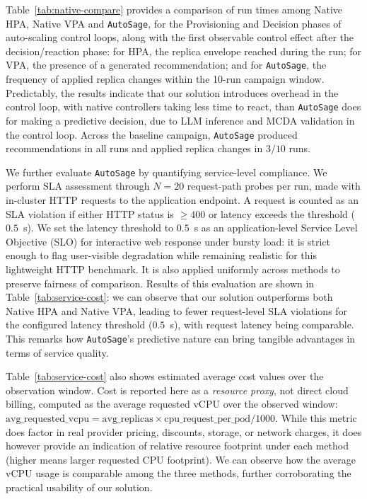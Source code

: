 \documentclass[sigconf]{acmart}
\newcommand{\Solution}{\texttt{AutoSage}}
\begin{document}
Table~\ref{tab:native-compare} provides a comparison of run times among Native HPA, Native VPA and \Solution{}, for the Provisioning and Decision phases of auto-scaling control loops, along with the first observable control effect after the decision/reaction phase: for HPA, the replica envelope reached during the run; for VPA, the presence of a generated recommendation; and for \Solution{}, the frequency of applied replica changes within the 10-run campaign window.
Predictably, the results indicate that our solution introduces overhead in the control loop, with native controllers taking less time to react,
than \Solution{} does for making a predictive decision, due to LLM inference and MCDA
validation in the control loop. Across the baseline
campaign, \Solution{} produced recommendations in all runs and applied
replica changes in \(3/10\) runs.

We further evaluate \Solution{} by quantifying service-level compliance. We perform SLA assessment through $N=20$ request-path probes per run, made with in-cluster HTTP
requests to the application endpoint. A request is counted as an SLA violation if either HTTP
status is \(\ge 400\) or latency exceeds the threshold (\(0.5\)~s). 
We set the latency threshold to \(0.5\)~s as an application-level Service Level Objective (SLO) for interactive web response under bursty load: it is strict enough to flag user-visible degradation while remaining realistic for this lightweight HTTP benchmark. It is also applied uniformly across methods to preserve fairness of comparison.
Results of this evaluation are shown in Table~\ref{tab:service-cost}:
we can observe that our solution outperforms both Native HPA and Native VPA, leading to fewer request-level SLA violations for the configured latency threshold (\(0.5\)~s), with request latency being comparable. This remarks how \Solution{}'s predictive nature can bring tangible advantages in terms of service quality.

Table~\ref{tab:service-cost} also shows estimated average cost values over the observation window. Cost is reported here as a \emph{resource proxy}, not direct cloud
billing, computed as the average requested vCPU over the observed window:
$\text{avg\_requested\_vcpu}=\text{avg\_replicas}\times
\text{cpu\_request\_per\_pod}/1000$. While this metric does factor in real provider pricing, discounts, storage, or network charges, it does however provide an indication of relative resource footprint
under each method (higher means larger requested CPU footprint). We can observe how the average vCPU usage is comparable among the three methods, further corroborating the practical usability of our solution.
\end{document}
